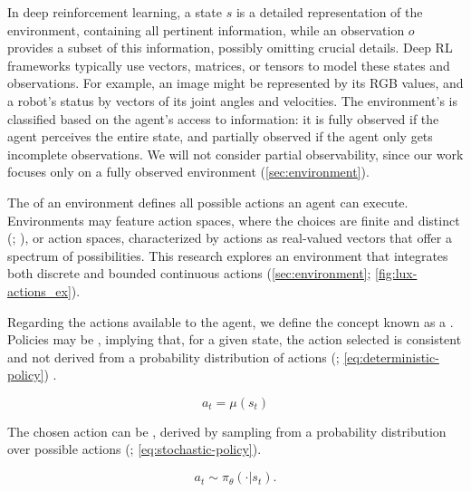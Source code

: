 \bigskip

\noindent In deep reinforcement learning, a state $s$ is a detailed representation of the environment, containing all pertinent information, while an observation $o$ provides a subset of this information, possibly omitting crucial details. Deep RL frameworks typically use vectors, matrices, or tensors to model these states and observations. For example, an image might be represented by its RGB values, and a robot's status by vectors of its joint angles and velocities. The environment's  is classified based on the agent's access to information: it is fully observed if the agent perceives the entire state, and partially observed if the agent only gets incomplete observations. We will not consider partial observability, since our work focuses only on a fully observed environment (\autoref{sec:environment}).

\bigskip

\noindent The  of an environment defines all possible actions an agent can execute. Environments may feature  action spaces, where the choices are finite and distinct (\textcolor{deepblue}{\cite{mnih2013playing}; \cite{SilverHuangEtAl16nature}}), or  action spaces, characterized by actions as real-valued vectors that offer a spectrum of possibilities. This research explores an environment that integrates both discrete and bounded continuous actions (\autoref{sec:environment}; \autoref{fig:lux-actions_ex}).

\bigskip

\noindent Regarding the actions available to the agent, we define the concept known as a . Policies may be , implying that, for a given state, the action selected is consistent and not derived from a probability distribution of actions (\textcolor{deepblue}{\cite{Sutton1998}; \autoref{eq:deterministic-policy}}) .

\begin{equation}
    a_t = \mu(s_t)
    \label{eq:deterministic-policy}
\end{equation}

\noindent The chosen action can be , derived by sampling from a probability distribution over possible actions (\textcolor{deepblue}{\cite{Sutton1998}; \autoref{eq:stochastic-policy}}).

\begin{equation}
    a_t \sim \pi_{\theta}(\cdot | s_t).
    \label{eq:stochastic-policy}
\end{equation}

